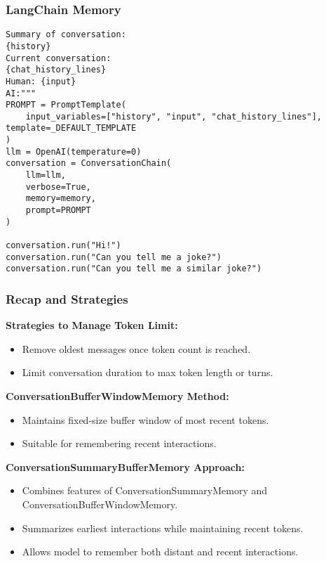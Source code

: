\begin{frame}[fragile]\frametitle{LangChain Memory}


\begin{lstlisting}
Summary of conversation:
{history}
Current conversation:
{chat_history_lines}
Human: {input}
AI:"""
PROMPT = PromptTemplate(
    input_variables=["history", "input", "chat_history_lines"], template=_DEFAULT_TEMPLATE
)
llm = OpenAI(temperature=0)
conversation = ConversationChain(
    llm=llm, 
    verbose=True, 
    memory=memory,
    prompt=PROMPT
)

conversation.run("Hi!")
conversation.run("Can you tell me a joke?")
conversation.run("Can you tell me a similar joke?")
\end{lstlisting}	  

\end{frame}


\begin{frame}[fragile]
\frametitle{Recap and Strategies}

\textbf{Strategies to Manage Token Limit:}
\begin{itemize}
    \item Remove oldest messages once token count is reached.
    \item Limit conversation duration to max token length or turns.
\end{itemize}

\textbf{ConversationBufferWindowMemory Method:}
\begin{itemize}
    \item Maintains fixed-size buffer window of most recent tokens.
    \item Suitable for remembering recent interactions.
\end{itemize}

\textbf{ConversationSummaryBufferMemory Approach:}
\begin{itemize}
    \item Combines features of ConversationSummaryMemory and ConversationBufferWindowMemory.
    \item Summarizes earliest interactions while maintaining recent tokens.
    \item Allows model to remember both distant and recent interactions.
\end{itemize}

\end{frame}

